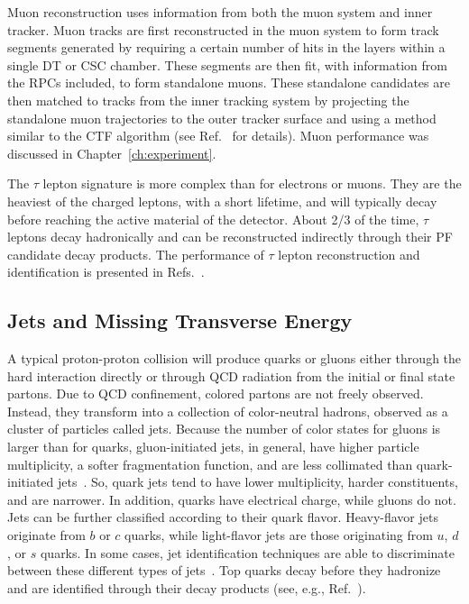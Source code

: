Muon reconstruction uses information from both the muon system and inner tracker. Muon tracks are first reconstructed in the muon system to form track segments generated by requiring a certain number of hits in the layers within a single DT or CSC chamber. These segments are then fit, with information from the RPCs included, to form standalone muons. These standalone candidates are then matched to tracks from the inner tracking system by projecting the standalone muon trajectories to the outer tracker surface and using a method similar to the CTF algorithm (see Ref.~\cite{Sirunyan:2018fpa} for details). Muon performance was discussed in Chapter~\ref{ch:experiment}.

The $\tau$ lepton signature is more complex than for electrons or muons. They are the heaviest of the charged leptons, with a short lifetime, and will typically decay before reaching the active material of the detector. About 2/3 of the time, $\tau$ leptons decay hadronically and can be reconstructed indirectly through their PF candidate decay products. The performance of $\tau$ lepton reconstruction and identification is presented in Refs.~\cite{Chatrchyan:2012zz,Sirunyan:2018pgf}.

\subsection{Jets and Missing Transverse Energy}\label{sec:jets}

A typical proton-proton collision will produce quarks or gluons either through the hard interaction directly or through QCD radiation from the initial or final state partons. Due to QCD confinement, colored partons are not freely observed. Instead, they transform into a collection of color-neutral hadrons, observed as a cluster of particles called jets. Because the number of color states for gluons is larger than for quarks, gluon-initiated jets, in general, have higher particle multiplicity, a softer fragmentation function, and are less collimated than quark-initiated jets~\cite{CMS:2013kfa,Aad:2014gea}. So, quark jets tend to have lower multiplicity, harder constituents, and are narrower. In addition, quarks have electrical charge, while gluons do not. Jets can be further classified according to their quark flavor. Heavy-flavor jets originate from $b$ or $c$ quarks, while light-flavor jets are those originating from $u$, $d$, or $s$ quarks. In some cases, jet identification techniques are able to discriminate between these different types of jets~\cite{Asquith:2018igt,Sirunyan:2017ezt}. Top quarks decay before they hadronize and are identified through their decay products (see, e.g., Ref.~\cite{Sirunyan:2017huu}).


